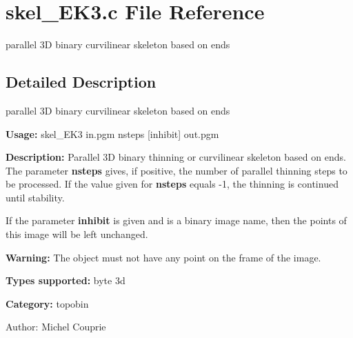 \section{skel\_\-EK3.c File Reference}
\label{skel__EK3_8c}
parallel 3D binary curvilinear skeleton based on ends  




\label{_details}
\subsection{Detailed Description}
parallel 3D binary curvilinear skeleton based on ends 

{\bf Usage:} skel\_\-EK3 in.pgm nsteps [inhibit] out.pgm

{\bf Description:} Parallel 3D binary thinning or curvilinear skeleton based on ends. The parameter {\bf nsteps} gives, if positive, the number of parallel thinning steps to be processed. If the value given for {\bf nsteps} equals -1, the thinning is continued until stability.

If the parameter {\bf inhibit} is given and is a binary image name, then the points of this image will be left unchanged.

{\bf Warning:} The object must not have any point on the frame of the image.

{\bf Types supported:} byte 3d

{\bf Category:} topobin

\begin{Desc}
\item[Author:]Michel Couprie \end{Desc}
